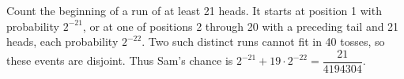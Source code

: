 Count the beginning of a run of at least 21 heads. It starts at position 1 with probability $2^{-21}$, or at one of positions 2 through 20 with a preceding tail and 21 heads, each probability $2^{-22}$. Two such distinct runs cannot fit in 40 tosses, so these events are disjoint. Thus Sam's chance is $2^{-21}+19\cdot2^{-22}=\boxed{\dfrac{21}{4194304}}$.
